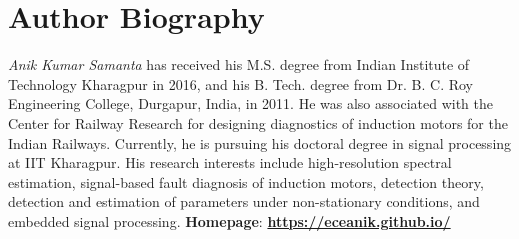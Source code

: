 \chapter*{Author Biography}

\vspace*{0.15\textheight}

{\em Anik Kumar Samanta} has received his M.S. degree from Indian Institute of Technology Kharagpur in 2016, and his B. Tech. degree from Dr. B. C. Roy Engineering College, Durgapur, India, in 2011. He was also associated with the Center for Railway Research for designing diagnostics of induction motors for the Indian Railways. Currently, he is pursuing his doctoral degree in signal processing at IIT Kharagpur. His research interests include high-resolution spectral estimation, signal-based fault diagnosis of induction motors, detection theory, detection and estimation of parameters under non-stationary conditions, and embedded signal processing. \noindent \textbf{Homepage}: \href{https://eceanik.github.io/}\textbf{{https://eceanik.github.io/}}
